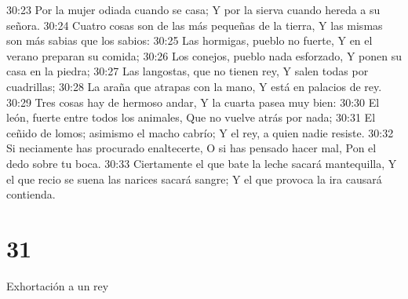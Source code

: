 30:23 Por la mujer odiada cuando se casa;  
Y por la sierva cuando hereda a su señora.  
30:24 Cuatro cosas son de las más pequeñas de la tierra,  
Y las mismas son más sabias que los sabios:  
30:25 Las hormigas, pueblo no fuerte,  
Y en el verano preparan su comida;  
30:26 Los conejos, pueblo nada esforzado,  
Y ponen su casa en la piedra;  
30:27 Las langostas, que no tienen rey,  
Y salen todas por cuadrillas; 
30:28 La araña que atrapas con la mano,  
Y está en palacios de rey.  
30:29 Tres cosas hay de hermoso andar,  
Y la cuarta pasea muy bien: 
30:30 El león, fuerte entre todos los animales,  
Que no vuelve atrás por nada;  
30:31 El ceñido de lomos; asimismo el macho cabrío;  
Y el rey, a quien nadie resiste.  
30:32 Si neciamente has procurado enaltecerte,  
O si has pensado hacer mal,  
Pon el dedo sobre tu boca.  
30:33 Ciertamente el que bate la leche sacará mantequilla,  
Y el que recio se suena las narices sacará sangre;  
Y el que provoca la ira causará contienda.  

\chapter{31}

Exhortación a un rey  

